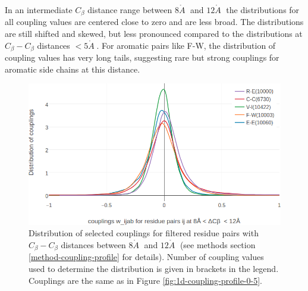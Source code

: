 \documentclass[11pt,a4paper,twoside]{book}
\newcommand{\Cb}{C_\beta}
\newcommand{\angstrom}{\mathring{A} \;}
\theoremstyle{definition}
\theoremstyle{definition}
\theoremstyle{remark}
\begin{document}
In an intermediate \(\Cb\) distance range between \(8\angstrom\) and
\(12\angstrom\) the distributions for all coupling values are centered
close to zero and are less broad. The distributions are still shifted
and skewed, but less pronounced compared to the distributions at
\(\Cb-\Cb\) distances \(< 5\angstrom\). For aromatic pairs like F-W, the
distribution of coupling values has very long tails, suggesting rare but
strong couplings for aromatic side chains at this distance.








\begin{figure}
\includegraphics[width=1\linewidth]{img/coupling_matrix_analysis/1d_coupling_profile_8_12} \caption{Distribution of selected
couplings for filtered residue pairs with \(\Cb-\Cb\) distances between
\(8\angstrom\) and \(12 \angstrom\) (see methods section
\ref{method-coupling-profile} for details). Number of coupling values
used to determine the distribution is given in brackets in the legend.
Couplings are the same as in Figure \ref{fig:1d-coupling-profile-0-5}.}\label{fig:1d-coupling-profile-8-12}
\end{figure}
\end{document}
